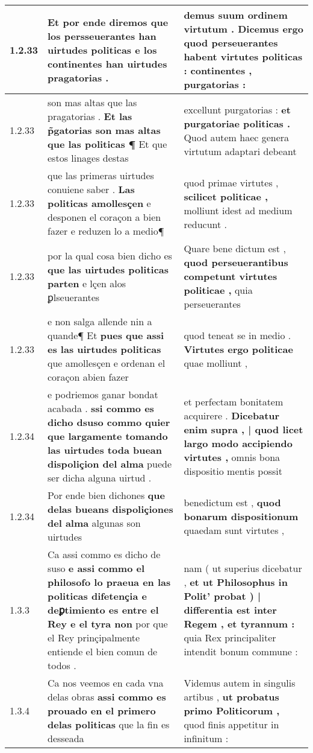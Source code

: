 \begin{tabular}{|p{1cm}|p{6.5cm}|p{6.5cm}|}
1.2.33 & Et por ende diremos \textbf{ que los persseuerantes han uirtudes politicas } e los continentes han uirtudes pragatorias . & demus suum ordinem virtutum . \textbf{ Dicemus ergo quod perseuerantes habent virtutes politicas : } continentes , purgatorias : \\\hline
1.2.33 & son mas altas que las pragatorias . \textbf{ Et las p̃gatorias son mas altas que las politicas ¶ } Et que estos linages destas & excellunt purgatorias : \textbf{ et purgatoriae politicas . } Quod autem haec genera virtutum adaptari debeant \\\hline
1.2.33 & que las primeras uirtudes conuiene saber . \textbf{ Las politicas amollesçen } e desponen el coraçon a bien fazer e reduzen lo a medio¶ & quod primae virtutes , \textbf{ scilicet politicae , } molliunt idest ad medium reducunt . \\\hline
1.2.33 & por la qual cosa bien dicho es \textbf{ que las uirtudes politicas parten } e lçen alos ꝑlseuerantes & Quare bene dictum est , \textbf{ quod perseuerantibus competunt virtutes politicae , } quia perseuerantes \\\hline
1.2.33 & e non salga allende nin a quande¶ Et \textbf{ pues que assi es las uirtudes politicas } que amollesçen e ordenan el coraçon abien fazer & quod teneat se in medio . \textbf{ Virtutes ergo politicae } quae molliunt , \\\hline
1.2.34 & e podriemos ganar bondat acabada . \textbf{ ssi commo es dicho dsuso commo quier que largamente tomando las uirtudes toda buean dispoliçion del alma } puede ser dicha alguna uirtud . & et perfectam bonitatem acquirere . \textbf{ Dicebatur enim supra , | quod licet largo modo accipiendo virtutes , } omnis bona dispositio mentis possit \\\hline
1.2.34 & Por ende bien dichones \textbf{ que delas bueans dispoliçiones del alma } algunas son uirtudes & benedictum est , \textbf{ quod bonarum dispositionum } quaedam sunt virtutes , \\\hline
1.3.3 & Ca assi commo es dicho de suso \textbf{ e assi commo el philosofo lo praeua en las politicas difetençia e deꝑtimiento es entre el Rey e el tyra non } por que el Rey prinçipalmente entiende el bien comun de todos . & nam ( ut superius dicebatur , \textbf{ et ut Philosophus in Polit’ probat ) | differentia est inter Regem , et tyrannum : } quia Rex principaliter intendit bonum commune : \\\hline
1.3.4 & Ca nos veemos en cada vna delas obras \textbf{ assi commo es prouado en el primero delas politicas } que la fin es desseada & Videmus autem in singulis artibus , \textbf{ ut probatus primo Politicorum , } quod finis appetitur in infinitum : \\\hline

\end{tabular}
